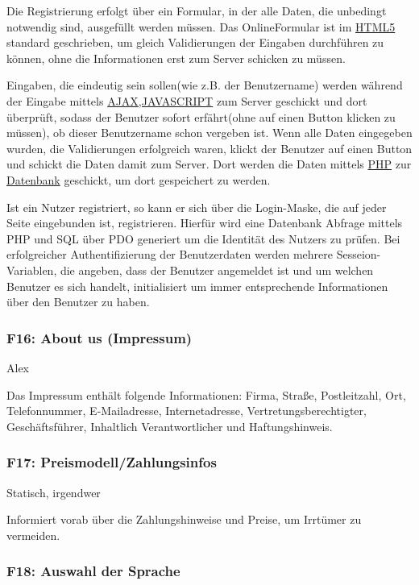 \documentclass[10pt,a4paper]{scrartcl}
\begin{document}
Die Registrierung erfolgt über ein Formular, in der alle Daten, die unbedingt notwendig sind, ausgefüllt werden müssen.
Das OnlineFormular ist im \underline{HTML5} standard geschrieben, um gleich Validierungen der Eingaben durchführen zu können, 
ohne die Informationen erst zum Server schicken zu müssen.

Eingaben, die eindeutig sein sollen(wie z.B. der Benutzername) werden während der Eingabe mittels \underline{AJAX,JAVASCRIPT} 
zum Server geschickt und dort überprüft, sodass der Benutzer sofort erfährt(ohne auf einen Button klicken zu müssen), ob dieser Benutzername schon vergeben ist. Wenn alle Daten eingegeben wurden, die Validierungen erfolgreich waren, klickt der Benutzer auf einen Button und schickt die Daten damit zum Server. Dort werden die Daten mittels \underline{PHP} zur \underline{Datenbank} geschickt, um dort gespeichert zu werden.

\bigskip

Ist ein Nutzer registriert, so kann er sich über die Login-Maske, die auf jeder Seite eingebunden ist, registrieren. Hierfür wird eine Datenbank Abfrage mittels PHP und SQL über PDO generiert um die Identität des Nutzers zu prüfen. Bei erfolgreicher Authentifizierung der Benutzerdaten werden mehrere Sesseion-Variablen, die angeben, dass der Benutzer angemeldet ist und um welchen Benutzer es sich handelt, initialisiert um immer entsprechende Informationen über den Benutzer zu haben.

\subsubsection*{F16: About us (Impressum)}

Alex

Das Impressum enthält folgende Informationen: Firma, Straße, Postleitzahl, Ort, Telefonnummer, E-Mailadresse, Internetadresse, Vertretungsberechtigter, \\ Geschäftsführer, Inhaltlich Verantwortlicher und Haftungshinweis. 

\subsubsection*{F17: Preismodell/Zahlungsinfos}

Statisch, irgendwer

Informiert vorab über die Zahlungshinweise und Preise, um Irrtümer zu vermeiden.

\subsubsection*{F18: Auswahl der Sprache}
\end{document}
